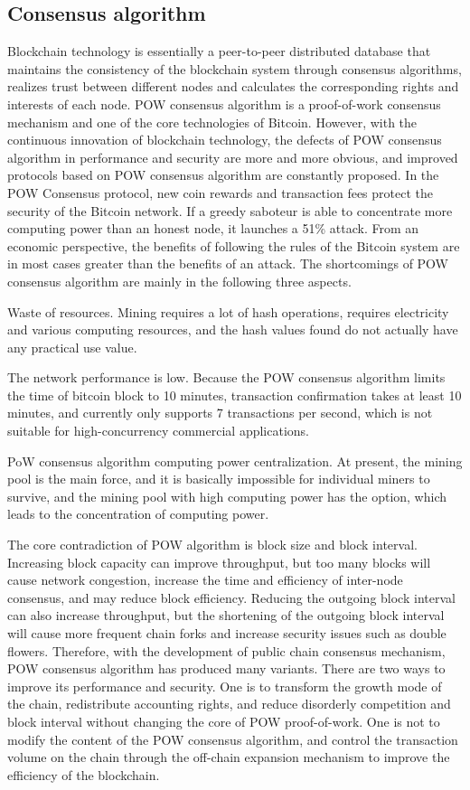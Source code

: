 \documentclass[lettersize,journal]{IEEEtran}
\begin{document}
\subsection{Consensus algorithm}
Blockchain technology is essentially a peer-to-peer distributed database that maintains the consistency of the blockchain system through consensus algorithms, realizes trust between different nodes and calculates the corresponding rights and interests of each node. POW consensus algorithm is a proof-of-work consensus mechanism and one of the core technologies of Bitcoin. However, with the continuous innovation of blockchain technology, the defects of POW consensus algorithm in performance and security are more and more obvious, and improved protocols based on POW consensus algorithm are constantly proposed. In the POW Consensus protocol, new coin rewards and transaction fees protect the security of the Bitcoin network. If a greedy saboteur is able to concentrate more computing power than an honest node, it launches a 51\% attack. From an economic perspective, the benefits of following the rules of the Bitcoin system are in most cases greater than the benefits of an attack. The shortcomings of POW consensus algorithm are mainly in the following three aspects.

Waste of resources. Mining requires a lot of hash operations, requires electricity and various computing resources, and the hash values found do not actually have any practical use value.

The network performance is low. Because the POW consensus algorithm limits the time of bitcoin block to 10 minutes, transaction confirmation takes at least 10 minutes, and currently only supports 7 transactions per second, which is not suitable for high-concurrency commercial applications.

PoW consensus algorithm computing power centralization. At present, the mining pool is the main force, and it is basically impossible for individual miners to survive, and the mining pool with high computing power has the option, which leads to the concentration of computing power.

The core contradiction of POW algorithm is block size and block interval. Increasing block capacity can improve throughput, but too many blocks will cause network congestion, increase the time and efficiency of inter-node consensus, and may reduce block efficiency. Reducing the outgoing block interval can also increase throughput, but the shortening of the outgoing block interval will cause more frequent chain forks and increase security issues such as double flowers.
Therefore, with the development of public chain consensus mechanism, POW consensus algorithm has produced many variants. There are two ways to improve its performance and security. One is to transform the growth mode of the chain, redistribute accounting rights, and reduce disorderly competition and block interval without changing the core of POW proof-of-work. One is not to modify the content of the POW consensus algorithm, and control the transaction volume on the chain through the off-chain expansion mechanism to improve the efficiency of the blockchain.
\end{document}
